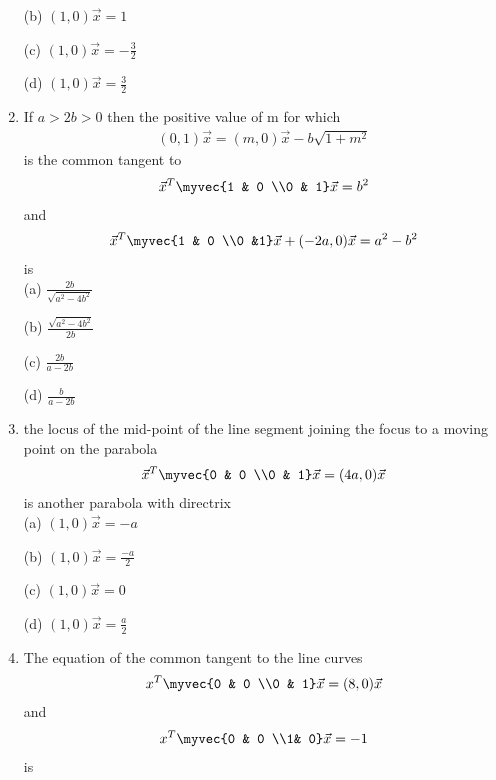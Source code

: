 \begin{enumerate}
    \choice (b) $(1,0)\vec x=1$
    
    \choice (c) $(1,0)\vec x=-\frac{3}{2}$
    
    \choice (d) $(1,0)\vec x=\frac{3}{2}$\\
    
    \item If $a>2b>0$ then the positive value of m for which \begin{align}(0,1)\vec x=(m,0)\vec x-b\sqrt{1+m^2}\end{align} is the common tangent to \begin{align}\vec x^T\myvec{1 & 0 \\0 & 1}\vec x=b^2\end {align}and \begin{align}\vec x^T\myvec {1 & 0 \\0 &1}\vec x+(-2a,0)\vec x=a^2-b^2\end{align} is \\
    
    \choice (a) $\frac{2b}{\sqrt{a^2-4b^2}}$
    
    \choice (b) $\frac{\sqrt{a^2-4b^2}}{2b}$
    
    \choice (c) $\frac{2b}{a-2b}$
    
    \choice (d) $\frac{b}{a-2b}$\\
    
    \item the locus of the mid-point of the line segment joining the focus to a moving point on the parabola  \begin{align} \vec x^T\myvec{0 & 0 \\0 & 1}\vec x=(4a,0)\vec x\end{align} is another parabola with directrix \\
    
    \choice (a) $(1,0)\vec x=-a$
    
    \choice (b) $(1,0)\vec x=\frac{-a}{2}$
    
    \choice (c) $(1,0)\vec x=0$
    
    \choice (d) $(1,0)\vec x=\frac{a}{2}$\\
    
    \item The equation of the common tangent to the line curves \begin{align} x^T \myvec {0 & 0 \\0 & 1}\vec x=(8,0)\vec x\end {align} and \begin{align} x^T \myvec
    {0 & 0 \\1& 0}\vec x=-1\end{align}is\\
    

\end{enumerate}
